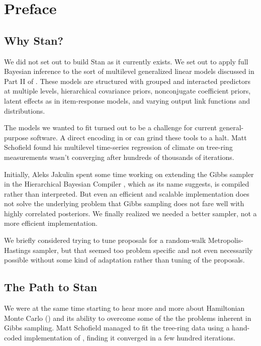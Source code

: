 \chapter*{Preface}

\section*{Why Stan?}

We did not set out to build Stan as it currently exists.  We set out to
apply full Bayesian inference to the sort of multilevel generalized
linear models discussed in Part II of \citep{GelmanHill:2007}.  These
models are structured with grouped and interacted predictors at
multiple levels, hierarchical covariance priors, nonconjugate
coefficient priors, latent effects as in item-response models, and
varying output link functions and distributions.

The models we wanted to fit turned out to be a challenge for current
general-purpose software.  A direct encoding in \BUGS or \JAGS can
grind these tools to a halt.  Matt Schofield found his multilevel
time-series regression of climate on tree-ring measurements wasn't
converging after hundreds of thousands of iterations.

Initially, Aleks Jakulin spent some time working on extending the
Gibbs sampler in the Hierarchical Bayesian Compiler
\citep{DaumeIII:2007}, which as its name suggests, is compiled rather
than interpreted.  But even an efficient and scalable implementation
does not solve the underlying problem that Gibbs sampling does not
fare well with highly correlated posteriors.  We finally realized we
needed a better sampler, not a more efficient implementation.

We briefly considered trying to tune proposals for a random-walk
Metropolis-Hastings sampler, but that seemed too problem specific and
not even necessarily possible without some kind of adaptation rather
than tuning of the proposals.


\section*{The Path to Stan}

We were at the same time starting to hear more and more about
Hamiltonian Monte Carlo (\HMC) and its ability to overcome some of the
the problems inherent in Gibbs sampling.  Matt Schofield managed to
fit the tree-ring data using a hand-coded implementation of \HMC,
finding it converged in a few hundred iterations.

